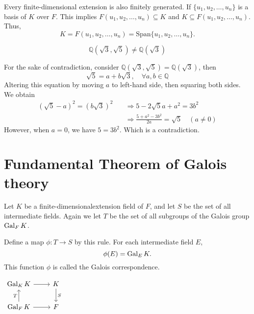 \begin{example}
    Every finite-dimensional extension is also finitely generated. If $\{ u_1, u_2, \ldots, u_n \}$ 
    is a basis of $K$ over $F$. This implies $F(u_1, u_2, \ldots, u_n) \subseteq K$ and 
    $K \subseteq F(u_1, u_2, \ldots, u_n)$. 
    Thus,
    \[
        K = F(u_1, u_2, \ldots, u_n) = \text{Span}\{ u_1, u_2, \ldots, u_n \}.
    \]
\end{example}

\begin{example}
     $$\mathbb{Q}(\sqrt{3}, \sqrt{5}) \neq \mathbb{Q}(\sqrt{3})$$
\end{example}
\begin{solution}
    For the sake of contradiction, consider $\mathbb{Q}(\sqrt{3}, \sqrt{5}) = \mathbb{Q}(\sqrt{3})$, then 
    \[
        \sqrt{5} = a+ b\sqrt{3}, \quad \forall a,b \in \mathbb{Q}
    \]
    Altering this equation by moving $a$ to left-hand side, then squaring both sides. We obtain
    \begin{align*}
        (\sqrt{5} - a)^2 = (b\sqrt{3})^2 \quad &\Rightarrow 5 - 2\sqrt{5}a + a^2 = 3b^2\\
        &\Rightarrow \frac{5 + a^2 - 3b^2}{2a} = \sqrt{5} \quad (a\neq 0)
    \end{align*}
    However, when $a=0$, we have $5 = 3b^2$. Which is a contradiction.
\end{solution}

\section{Fundamental Theorem of Galois theory}

\begin{definition}
    Let $K$ be a finite-dimensionalextension field of $F$, and let 
    $S$ be the set of all intermediate fields. Again we let 
    $T$ be the set of all subgroups of the Galois group $\operatorname{Gal}_F K$.

    Define a map $\phi : T \to S$ by this rule. For each intermediate field $E$,
    \begin{equation}
        \phi(E) = \operatorname{Gal}_E K.
    \end{equation} 
    This function $\phi$ is called the Galois correspondence.

    \begin{center}
        $\begin{tikzcd}
            \gal_K K \arrow[r] 
            & K \arrow[d, "S"] \\
            \gal_F K \arrow[u,"T"] \arrow[r]
            & F
            \end{tikzcd}
        $
    \end{center}
\end{definition}

